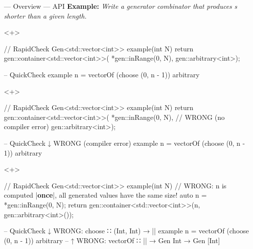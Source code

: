 \begin{frame}[fragile,t]{\halcheck{} --- Overview --- API}
  \textbf{Example:} \emph{Write a generator combinator that produces s shorter than a given length.}

  \begin{onlyenv}<+>
    \begin{cppcode}
      // RapidCheck
      Gen<std::vector<int>> example(int N) {
        return gen::container<std::vector<int>>(
          *gen::inRange(0, N),
          gen::arbitrary<int>);
      }
    \end{cppcode}

    \begin{haskellcode}
      -- QuickCheck
      example n = vectorOf (choose (0, n - 1)) arbitrary
    \end{haskellcode}
  \end{onlyenv}

  \begin{onlyenv}<+>
    \begin{cppcode}
      // RapidCheck
      Gen<std::vector<int>> example(int N) {
        return gen::container<std::vector<int>>(
          *gen::inRange(0, N), // WRONG (no compiler error)
          gen::arbitrary<int>);
      }
    \end{cppcode}

    \begin{haskellcode}
      -- QuickCheck         ↓ WRONG (compiler error)
      example n = vectorOf (choose (0, n - 1)) arbitrary
    \end{haskellcode}
  \end{onlyenv}

  \begin{onlyenv}<+>
    \begin{cppcode}
      // RapidCheck
      Gen<std::vector<int>> example(int N) {
        // WRONG: n is computed |\textbf{once}|, all generated values have the same size!
        auto n = *gen::inRange(0, N);
        return gen::container<std::vector<int>>(n, gen::arbitrary<int>());
      }
    \end{cppcode}
    \begin{haskellcode}
      -- QuickCheck         ↓ WRONG: choose ∷ (Int, Int) → |\color{red}{Gen Int}|
      example n = vectorOf (choose (0, n - 1)) arbitrary
      --          ↑ WRONG: vectorOf ∷ |\color{red}{Int}| → Gen Int → Gen [Int]
    \end{haskellcode}
  \end{onlyenv}


\end{frame}
